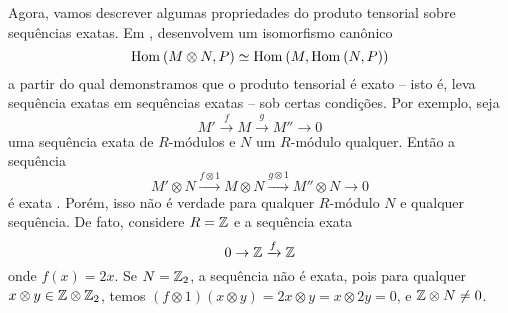 Agora, vamos descrever algumas propriedades do produto tensorial sobre sequências exatas. Em \cite[II, p.28]{atiyah}, \citeauthor{atiyah} desenvolvem um isomorfismo canônico \[\textrm{Hom}_{}\left( M\otimes N,P \right) \simeq \textrm{Hom}_{}\left( M,\textrm{Hom}_{}\left( N,P \right) \right)\] a partir do qual demonstramos que o produto tensorial é exato -- isto é, leva sequência exatas em sequências exatas -- sob certas condições. Por exemplo, seja \[M' \xrightarrow{f} M \xrightarrow{g} M'' \rightarrow 0\] uma sequência exata de $R$-módulos e $N$ um $R$-módulo qualquer. Então a sequência \[M'\otimes N \xrightarrow{f\otimes 1} M\otimes N \xrightarrow{g\otimes 1} M''\otimes N \rightarrow 0\] é exata \cite[II, Proposition 2.18.]{atiyah}. Porém, isso não é verdade para qualquer $R$-módulo $N$ e qualquer sequência. De fato, considere $R=\mathbb{Z}$ e a sequência exata \[0 \rightarrow \mathbb{Z} \xrightarrow{f} \mathbb{Z}\] onde $f(x)=2x$. Se $N=\mathbb{Z}_2$, a sequência não é exata, pois para qualquer $x\otimes y \in \mathbb{Z} \otimes \mathbb{Z}_2$, temos $(f\otimes 1)(x\otimes y)=2x\otimes y = x \otimes 2y = 0$, e $\mathbb{Z}\otimes N \neq 0$. \par 


